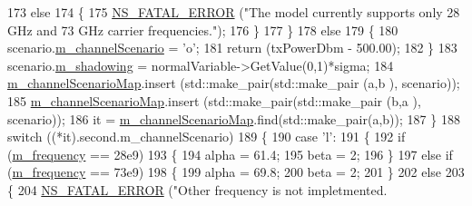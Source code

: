 \begin{DoxyCode}
173                                 \textcolor{keywordflow}{else}
174                                 \{
175                                         \hyperlink{group__fatal_ga5131d5e3f75d7d4cbfd706ac456fdc85}{NS\_FATAL\_ERROR} (\textcolor{stringliteral}{"The model currently supports only 28
       GHz and 73 GHz carrier frequencies."});
176                                 \}
177                         \}
178                         \textcolor{keywordflow}{else}
179                         \{
180                                 scenario.\hyperlink{structchannelScenario_adba9eb89f9bb89e643f8e254f0c84ca2}{m\_channelScenario} = \textcolor{charliteral}{'o'};
181                                 \textcolor{keywordflow}{return} (txPowerDbm - 500.00);
182                         \}
183                         scenario.\hyperlink{structchannelScenario_a1add7cf57d35dad246b30f36e08dcb9e}{m\_shadowing} = normalVariable->GetValue(0,1)*sigma;
184                         \hyperlink{classMmWavePropagationLossModel_a4de546f00ac6bff5b3a0da6fb8283986}{m\_channelScenarioMap}.insert (std::make\_pair(std::make\_pair (a,b
      ), scenario));
185                         \hyperlink{classMmWavePropagationLossModel_a4de546f00ac6bff5b3a0da6fb8283986}{m\_channelScenarioMap}.insert (std::make\_pair(std::make\_pair (b,a
      ), scenario));
186                         it = \hyperlink{classMmWavePropagationLossModel_a4de546f00ac6bff5b3a0da6fb8283986}{m\_channelScenarioMap}.find(std::make\_pair(a,b));
187                 \}
188                 \textcolor{keywordflow}{switch} ((*it).second.m\_channelScenario)
189                 \{
190                         \textcolor{keywordflow}{case} \textcolor{charliteral}{'l'}:
191                         \{
192                                 \textcolor{keywordflow}{if} (\hyperlink{classMmWavePropagationLossModel_ab13f20e31b1a3f9dddcf3cad2f75b2d9}{m\_frequency} == 28e9)
193                                 \{
194                                         alpha = 61.4;
195                                         beta = 2;
196                                 \}
197                                 \textcolor{keywordflow}{else} \textcolor{keywordflow}{if} (\hyperlink{classMmWavePropagationLossModel_ab13f20e31b1a3f9dddcf3cad2f75b2d9}{m\_frequency} == 73e9)
198                                 \{
199                                         alpha = 69.8;
200                                         beta = 2;
201                                 \}
202                                 \textcolor{keywordflow}{else}
203                                 \{
204                                         \hyperlink{group__fatal_ga5131d5e3f75d7d4cbfd706ac456fdc85}{NS\_FATAL\_ERROR} (\textcolor{stringliteral}{"Other frequency is not impletmented.
}
\end{DoxyCode}
